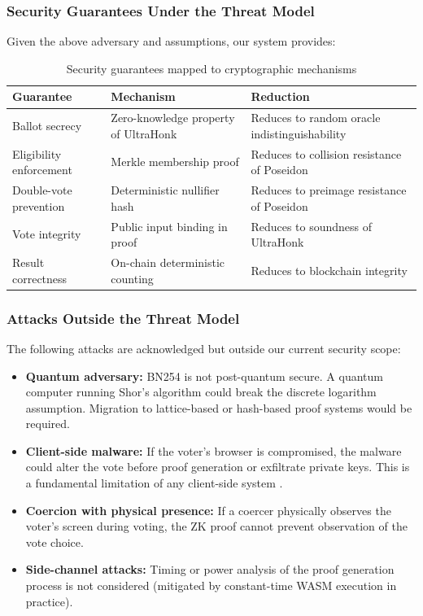 \documentclass[12pt, a4paper]{report}
\begin{document}
\subsubsection{Security Guarantees Under the Threat Model}

Given the above adversary and assumptions, our system provides:

\begin{table}[H]
\centering
\caption{Security guarantees mapped to cryptographic mechanisms}
\label{tab:threat_guarantees}
\begin{tabular}{|p{3.5cm}|p{4cm}|p{5cm}|}
\hline
\textbf{Guarantee} & \textbf{Mechanism} & \textbf{Reduction} \\ \hline
Ballot secrecy & Zero-knowledge property of UltraHonk & Reduces to random oracle indistinguishability \\ \hline
Eligibility enforcement & Merkle membership proof & Reduces to collision resistance of Poseidon \\ \hline
Double-vote prevention & Deterministic nullifier hash & Reduces to preimage resistance of Poseidon \\ \hline
Vote integrity & Public input binding in proof & Reduces to soundness of UltraHonk \\ \hline
Result correctness & On-chain deterministic counting & Reduces to blockchain integrity \\ \hline
\end{tabular}
\end{table}

\subsubsection{Attacks Outside the Threat Model}

The following attacks are acknowledged but outside our current security scope:

\begin{itemize}
    \item \textbf{Quantum adversary:} BN254 is not post-quantum secure. A quantum computer running Shor's algorithm could break the discrete logarithm assumption. Migration to lattice-based or hash-based proof systems would be required.
    
    \item \textbf{Client-side malware:} If the voter's browser is compromised, the malware could alter the vote before proof generation or exfiltrate private keys. This is a fundamental limitation of any client-side system \cite{ivoting-ccs2014, halderman2015ivote}.
    
    \item \textbf{Coercion with physical presence:} If a coercer physically observes the voter's screen during voting, the ZK proof cannot prevent observation of the vote choice.
    
    \item \textbf{Side-channel attacks:} Timing or power analysis of the proof generation process is not considered (mitigated by constant-time WASM execution in practice).
\end{itemize}
\end{document}
